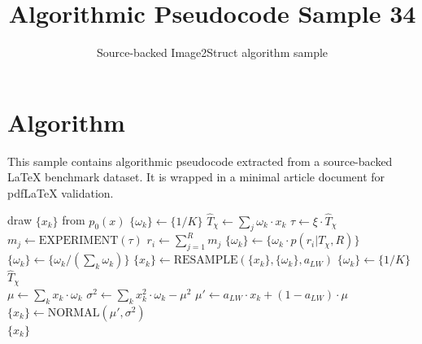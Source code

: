 \documentclass[11pt]{article}
\title{Algorithmic Pseudocode Sample 34}
\author{Source-backed Image2Struct algorithm sample}
\date{}
\begin{document}
\maketitle
\section{Algorithm}
This sample contains algorithmic pseudocode extracted from a source-backed LaTeX benchmark dataset. It is wrapped in a minimal article document for pdfLaTeX validation.

\begin{algorithm}[htbp]
\caption{Source-backed algorithmic procedure}
\begin{algorithmic}[1]
\State draw $\lbrace x_k \rbrace$ from $p_0(x)$
\State $\lbrace \omega_k \rbrace \gets \lbrace 1/K \rbrace$
\State $\hat{T}_{\chi} \gets \sum_j \omega_k \cdot x_k$
\State $\tau \gets \xi \cdot \hat{T}_{\chi}$
\State $m_j \gets \mbox{EXPERIMENT} (\tau)$
\EndFor
\State $r_i \gets \sum_{j=1}^R m_j$
\State $\lbrace \omega_k \rbrace \gets \lbrace \omega_k \cdot p \left(r_i|T_{\chi}, R \right) \rbrace$
\State $\lbrace \omega_k \rbrace \gets \lbrace \omega_k/\left(\sum_k \omega_k\right) \rbrace$
\State $\lbrace x_k \rbrace \gets \mbox{RESAMPLE} (\lbrace x_k \rbrace, \lbrace \omega_k \rbrace, a_{LW})$
\State $\lbrace \omega_k \rbrace \gets \lbrace 1/K \rbrace$
\EndIf
\EndFor
\\
\Return $\hat{T}_{\chi}$
\EndProcedure
\\
\State $\mu \gets \sum_k x_k \cdot \omega_k$
\State $\sigma^2 \gets \sum_k x_k^2 \cdot \omega_k - \mu^2$
\State $\mu' \gets a_{LW} \cdot x_k + (1-a_{LW})\cdot \mu$
\State $\lbrace x_k \rbrace \gets \mbox{NORMAL} (\mu', \sigma^2)$
\\
\Return $\lbrace x_k \rbrace$
\EndProcedure
\end{algorithmic}
\end{algorithm}
\end{document}
